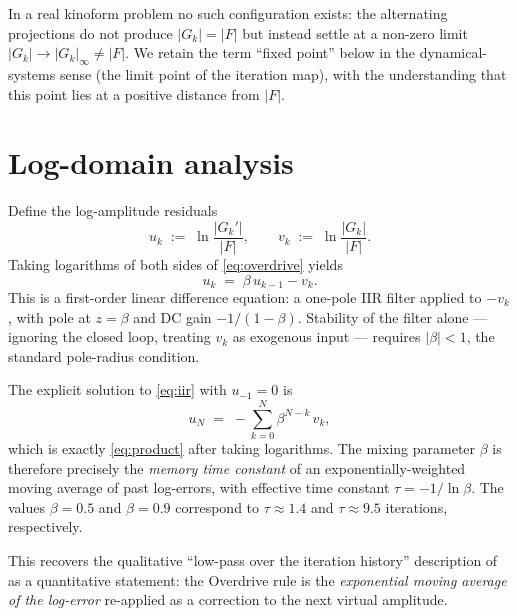 \documentclass[11pt,a4paper]{article}
\newcommand{\F}{\lvert F\rvert}
\newcommand{\Gk}{\lvert G_k\rvert}
\newcommand{\Gkp}{\lvert G_k'\rvert}
\begin{document}
In a real kinoform problem no such configuration exists: the alternating
projections do not produce $\Gk=\F$ but instead settle at a non-zero limit
$\Gk\to\Gk_{\!\infty}\neq\F$. We retain the term ``fixed point'' below in
the dynamical-systems sense (the limit point of the iteration map), with
the understanding that this point lies at a positive distance from $\F$.

\section{Log-domain analysis}\label{sec:log}

Define the log-amplitude residuals
\begin{equation}
  u_k \;:=\; \ln\frac{\Gkp}{\F}, \qquad
  v_k \;:=\; \ln\frac{\Gk}{\F}.
\end{equation}
Taking logarithms of both sides of \eqref{eq:overdrive} yields
\begin{equation}
  \boxed{\;u_k \;=\; \beta\,u_{k-1} - v_k.\;}
  \label{eq:iir}
\end{equation}
This is a first-order linear difference equation: a one-pole IIR filter
applied to $-v_k$, with pole at $z=\beta$ and DC gain $-1/(1-\beta)$. Stability
of the filter alone --- ignoring the closed loop, treating $v_k$ as exogenous
input --- requires $\lvert\beta\rvert<1$, the standard pole-radius condition.

The explicit solution to \eqref{eq:iir} with $u_{-1}=0$ is
\begin{equation}
  u_N \;=\; -\!\sum_{k=0}^{N}\beta^{N-k}\,v_k,
  \label{eq:explicit}
\end{equation}
which is exactly \eqref{eq:product} after taking logarithms. The mixing
parameter $\beta$ is therefore precisely the \emph{memory time constant} of an
exponentially-weighted moving average of past log-errors, with effective time
constant $\tau = -1/\ln\beta$. The values $\beta=0.5$ and $\beta=0.9$
correspond to $\tau\approx 1.4$ and $\tau\approx 9.5$ iterations, respectively.

This recovers the qualitative ``low-pass over the iteration history''
description of \cite{Bernau2012} as a quantitative statement: the Overdrive
rule is the \emph{exponential moving average of the log-error} re-applied as a
correction to the next virtual amplitude.

\end{document}
